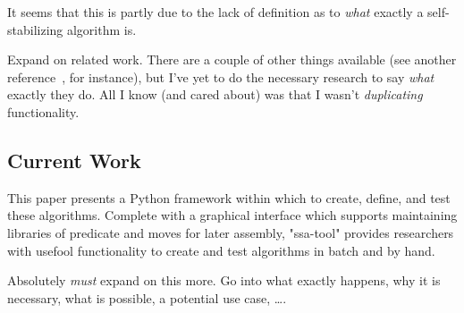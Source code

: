 It seems that this is partly due to the lack of definition as to
  \emph{what} exactly a self-stabilizing algorithm is.

\begin{draftvspace}{2in}
  Expand on related work.
  There are a couple of other things available
    (see another reference~\autocite{lafon:libcircle}, for instance),
    but I've yet to do the necessary research to say \emph{what} exactly they do.
  All I know (and cared about) was that I wasn't \emph{duplicating} functionality.
\end{draftvspace}

\subsection{Current Work}
\label{sec:introduction:current-work}
This paper presents a Python framework within which to
  create, define, and test these algorithms.
Complete with a graphical interface which supports
  maintaining libraries of predicate and moves for later assembly,
  "ssa-tool" provides researchers with usefool functionality
  to create and test algorithms in batch and by hand.
\begin{draftvspace}{4in}
  Absolutely \emph{must} expand on this more.
  Go into what exactly happens, why it is necessary, what is possible, a potential use case, \dots.
\end{draftvspace}

